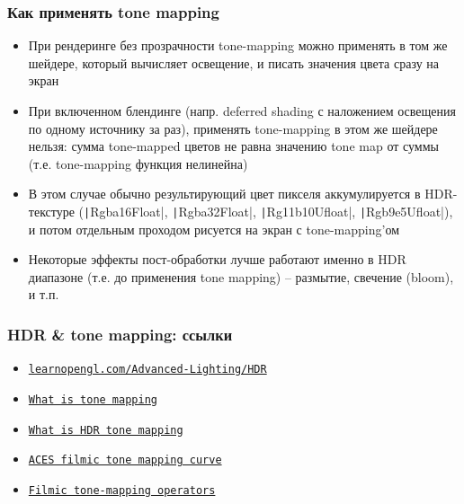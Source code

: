 \documentclass[10pt]{beamer}
\begin{document}
\begin{frame}[fragile]
\frametitle{Как применять tone mapping}
\begin{itemize}
\item При рендеринге без прозрачности tone-mapping можно применять в том же шейдере, который вычисляет освещение, и писать значения цвета сразу на экран
\pause
\item При включенном блендинге (напр. deferred shading с наложением освещения по одному источнику за раз), применять tone-mapping в этом же шейдере нельзя: сумма tone-mapped цветов не равна значению tone map от суммы (т.е. tone-mapping функция нелинейна)
\pause
\item В этом случае обычно результирующий цвет пикселя аккумулируется в HDR-текстуре (\texttt|Rgba16Float|, \texttt|Rgba32Float|, \texttt|Rg11b10Ufloat|, \texttt|Rgb9e5Ufloat|), и потом отдельным проходом рисуется на экран с tone-mapping'ом
\pause
\item Некоторые эффекты пост-обработки лучше работают именно в HDR диапазоне (т.е. до применения tone mapping) -- размытие, свечение (bloom), и т.п.
\end{itemize}
\end{frame}

\begin{frame}[fragile]
\frametitle{HDR \& tone mapping: ссылки}
\begin{itemize}
\item \href{https://learnopengl.com/Advanced-Lighting/HDR}{\texttt{learnopengl.com/Advanced-Lighting/HDR}}
\item \href{https://skylum.com/blog/what-is-tone-mapping}{\texttt{What is tone mapping}}
\item \href{https://www.veneratech.com/what-is-hdr-tone-mapping}{\texttt{What is HDR tone mapping}}
\item \href{https://knarkowicz.wordpress.com/2016/01/06/aces-filmic-tone-mapping-curve}{\texttt{ACES filmic tone mapping curve}}
\item \href{http://filmicworlds.com/blog/filmic-tonemapping-operators/}{\texttt{Filmic tone-mapping operators}}
\end{itemize}
\end{frame}
\end{document}

